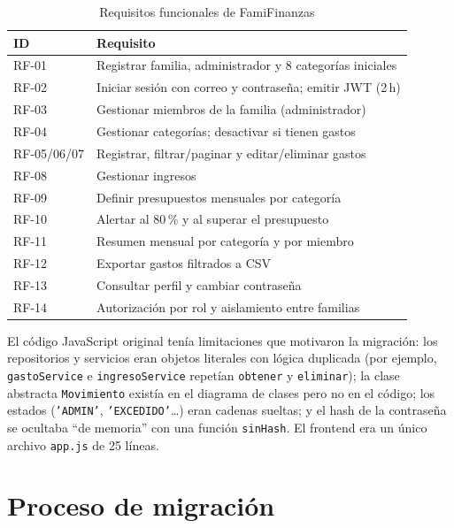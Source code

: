 \documentclass[conference,a4paper]{IEEEtran}
\begin{document}
\begin{table}[!t]
\centering
\caption{Requisitos funcionales de FamiFinanzas}
\label{tab:rf}
\footnotesize
\begin{tabularx}{\columnwidth}{@{}lX@{}}
\toprule
\textbf{ID} & \textbf{Requisito} \\
\midrule
RF-01 & Registrar familia, administrador y 8 categorías iniciales \\
RF-02 & Iniciar sesión con correo y contraseña; emitir JWT (2\,h) \\
RF-03 & Gestionar miembros de la familia (administrador) \\
RF-04 & Gestionar categorías; desactivar si tienen gastos \\
RF-05/06/07 & Registrar, filtrar/paginar y editar/eliminar gastos \\
RF-08 & Gestionar ingresos \\
RF-09 & Definir presupuestos mensuales por categoría \\
RF-10 & Alertar al 80\,\% y al superar el presupuesto \\
RF-11 & Resumen mensual por categoría y por miembro \\
RF-12 & Exportar gastos filtrados a CSV \\
RF-13 & Consultar perfil y cambiar contraseña \\
RF-14 & Autorización por rol y aislamiento entre familias \\
\bottomrule
\end{tabularx}
\end{table}

El código JavaScript original tenía limitaciones que motivaron la migración: los repositorios y servicios eran objetos literales con lógica duplicada (por ejemplo, \texttt{gastoService} e \texttt{ingresoService} repetían \texttt{obtener} y \texttt{eliminar}); la clase abstracta \texttt{Movimiento} existía en el diagrama de clases pero no en el código; los estados (\texttt{'ADMIN'}, \texttt{'EXCEDIDO'}\ldots) eran cadenas sueltas; y el hash de la contraseña se ocultaba ``de memoria'' con una función \texttt{sinHash}. El frontend era un único archivo \texttt{app.js} de 25 líneas.

\section{Proceso de migración}\label{sec:proceso}
\end{document}
